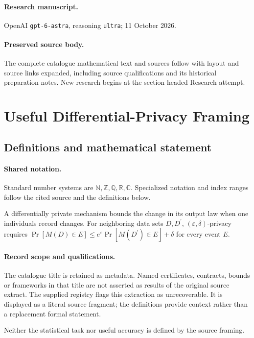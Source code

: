 \documentclass[11pt]{article}
\begin{document}
\paragraph{Research manuscript.} OpenAI \texttt{gpt-6-astra}, reasoning \texttt{ultra}; 11 October 2026.
\paragraph{Preserved source body.} The complete catalogue mathematical text and sources follow with layout and source links expanded, including source qualifications and its historical preparation notes. New research begins at the section headed Research attempt.

\section{Useful Differential-Privacy Framing}\label{statement}

\subsection{Definitions and mathematical statement}

\paragraph{Shared notation.}Standard number systems are $\mathbb N,\mathbb Z,\mathbb Q,\mathbb R,\mathbb C$. Specialized notation and index ranges follow the cited source and the definitions below.


A differentially private mechanism bounds the change in its output law when one individual\textquotesingle s record changes. For neighboring data sets $D,D^{\prime}$, $(\varepsilon,\delta)$-privacy requires $\Pr[M(D)\in E]\leq e^\varepsilon\Pr[M(D^{\prime})\in E]+\delta$ for every event $E$.
\paragraph{Record scope and qualifications.}
The catalogue title is retained as metadata. Named certificates, contracts, bounds or frameworks in that title are not asserted as results of the original source extract.
The supplied registry flags this extraction as unrecoverable. It is displayed as a literal source fragment; the definitions provide context rather than a replacement formal statement.

Neither the statistical task nor useful accuracy is defined by the source framing.
\end{document}
